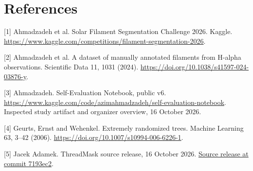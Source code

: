 \documentclass[sigconf]{acmart}
\begin{document}
\section*{References}
\begingroup\raggedright\small
[1] Ahmadzadeh et al. Solar Filament Segmentation Challenge 2026. Kaggle. \url{https://www.kaggle.com/competitions/filament-segmentation-2026}.

[2] Ahmadzadeh et al. A dataset of manually annotated filaments from H-alpha observations. Scientific Data 11, 1031 (2024). \url{https://doi.org/10.1038/s41597-024-03876-y}.

[3] Ahmadzadeh. Self-Evaluation Notebook, public v6. \url{https://www.kaggle.com/code/azimahmadzadeh/self-evaluation-notebook}. Inspected study artifact and organizer overview, 16 October 2026.

[4] Geurts, Ernst and Wehenkel. Extremely randomized trees. Machine Learning 63, 3--42 (2006). \url{https://doi.org/10.1007/s10994-006-6226-1}.

[5] Jacek Adamek. ThreadMask source release, 16 October 2026. \href{https://github.com/jacman1988-super/solar-threadmask/tree/7193ec292d0dee31993c5bd23e013ea49ffdc981/releases/2026-10-16}{Source release at commit 7193ec2}.
\endgroup
\end{document}
